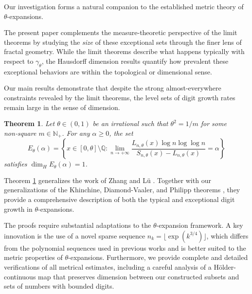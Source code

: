 \documentclass{article}
\newtheorem{theorem}{Theorem}[section]
\numberwithin{equation}{section}
\begin{document}
 
{Our investigation forms a natural companion to the established metric theory of $\theta$-expansions. }

{
The present paper complements the measure-theoretic perspective of the limit theorems by studying the \emph{size} of these exceptional sets through the finer lens of fractal geometry. While the limit theorems describe what happens typically with respect to $\gamma_\theta$, the Hausdorff dimension results quantify how prevalent these exceptional behaviors are within the topological or dimensional sense.
}

Our main results demonstrate that despite the strong almost-everywhere constraints revealed by the limit theorems, the level sets of digit growth rates remain large in the sense of dimension.

\begin{theorem}\label{thm:main}
{Let $\theta\in(0,1)$ be an irrational such that $\theta^2=1/m$ for some non‑square $m\in\mathbb{N}_+$. }
For any $\alpha \geq 0$, the set
\[
E_\theta(\alpha) = \left\{ x \in [0, \theta] \setminus \mathbb{Q} : \lim_{n \to +\infty} \frac{L_{n,\theta}(x) \log n \log \log n}{S_{n,\theta}(x) - L_{n,\theta}(x)} = \alpha \right\}
\]
satisfies $\dim_H E_\theta(\alpha) = 1$.
\end{theorem}


Theorem \ref{thm:main} generalizes the work of Zhang and L\"u \cite{ZhangLu}.  Together with our generalizations of the Khinchine, Diamond-Vaaler, and Philipp theorems \cite{RusuSebeLascu}, they provide a comprehensive description of both the typical and exceptional digit growth in $\theta$-expansions.

The proofs require substantial adaptations to the $\theta$-expansion framework. A key innovation is the use of a novel sparse sequence $n_k = \lfloor \exp(k^{3/4}) \rfloor$, which differs from the polynomial sequences used in previous works and is better suited to the metric properties of $\theta$-expansions. Furthermore, we provide complete and detailed verifications of all metrical estimates, including a careful analysis of a Hölder-continuous map that preserves dimension between our constructed subsets and sets of numbers with bounded digits.
\end{document}
